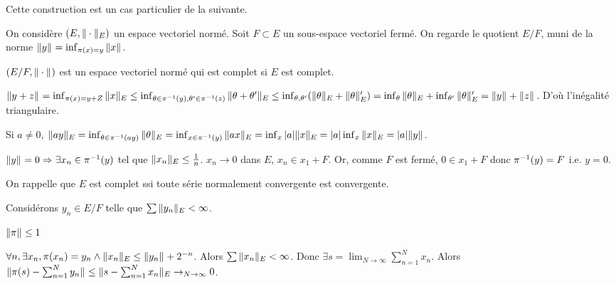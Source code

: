 \documentclass[10pt,a4paper,notitlepage ]{report}
\begin{document}
\begin{rem}

Cette construction est un cas particulier de la suivante.

On considère $(E,\norm[E]\cdot)$ un espace vectoriel normé. Soit $F\subset E$ un sous-espace vectoriel fermé. On regarde le quotient $E/F$, muni de la norme $\norm y = \inf_{\pi(x)=y} \norm x$.

\begin{propriete}
	$(E/F,\norm\cdot)$ est un espace vectoriel normé qui est complet si $E$ est complet.
\end{propriete}
\begin{demo}
	$\norm{y+z} = \inf_{\pi(x) = y+Z} \norm[E] x \le \inf_{\theta \in \inv\pi(y), \theta' \in \inv\pi(z)} \norm[E]{\theta+\theta'} \le \inf_{\theta,\theta'}(\norm[E] \theta + \norm[E] \theta') = \inf_\theta \norm[E]\theta + \inf_{\theta'}\norm[E]\theta' = \norm y + \norm z$. D'où l'inégalité triangulaire.
	
	Si $a\neq 0$, $\norm[E]{ay} = \inf_{\theta\in\inv\pi(ay)}\norm[E]\theta = \inf_{x\in\inv\pi(y)}\norm[E]{ax} = \inf_x |a|\norm[E] x = |a|\inf_x \norm[E] x = |a|\norm y$.
	
	$\norm y = 0 \Rightarrow \exists x_n \in \inv\pi(y)$ tel que $\norm[E] {x_n} \le \frac 1 n$. $x_n \rightarrow 0$ dans $E$, $x_n\in x_1+F$. Or, comme $F$ est fermé, $0\in x_1+F$ donc $\inv\pi(y)=F$ i.e. $y=0$.
	
	On rappelle que $E$ est complet ssi toute série normalement convergente est convergente.
	
	Considérons $y_n\in E/F$ telle que $\sum\norm[E]{y_n} < \infty$.
	
	\begin{rem}
		$\norm\pi \le 1$
	\end{rem}
	
	$\forall n, \exists x_n , \pi(x_n)=y_n \wedge \norm[E]{x_n}\le\norm{y_n}+2^{-n}$. Alors $\sum\norm[E]{x_n} < \infty$. Donc $\exists s = \lim_{N\rightarrow \infty} \sum_{n=1}^N x_n$. Alors $\norm{\pi(s) - \sum_{n=1}^Ny_n} \le \norm[E]{s-\sum_{n=1}^N x_n} \rightarrow_{N\rightarrow \infty} 0$.
\end{demo}

\end{rem}
\end{document}
